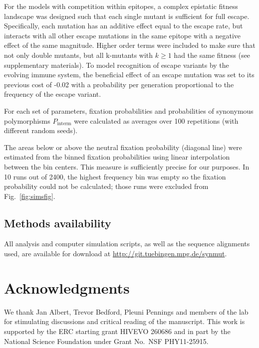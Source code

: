 \documentclass[rmp, twocolumn]{revtex4}
\newcommand{\FIG}[1]{Fig.~\ref{fig:#1}}
\begin{document}
For the models with competition within epitopes, a complex epistatic fitness
landscape was designed such that each single mutant is sufficient for full
escape. Specifically, each mutation has an additive effect equal to the
escape rate, but interacts with all other escape mutations in the same
epitope with a negative effect of the same magnitude. 
Higher order terms were included to make sure that not
only double mutants, but all k-mutants with $k \geq 1$ had the same fitness (see
supplementary materials). To model recognition of escape variants by the
evolving immune system, the beneficial effect of an escape mutation was set
to its previous cost of -0.02 with a probability per generation proportional to
the frequency of the escape variant.

For each set of parameters, fixation probabilities and probabilities of
synonymous polymorphisms $P_\text{interm}$ were calculated as averages over
100 repetitions (with different random seeds).

The areas below or above the neutral fixation probability (diagonal line) were
estimated from the binned fixation probabilities using linear interpolation
between the bin centers. This measure is sufficiently precise for our purposes.
In 10 runs out of 2400, the highest frequency bin was empty so the fixation
probability could not be calculated; those runs were excluded from
\FIG{simsfig}.

\subsection*{Methods availability}
All analysis and computer simulation scripts, as well as the sequence alignments
used, are available for download at \url{http://git.tuebingen.mpg.de/synmut}.

\section*{Acknowledgments}
We thank Jan Albert, Trevor Bedford, Pleuni Pennings and members of the lab for 
stimulating discussions and critical reading of the manuscript.
This work is supported by the ERC starting grant HIVEVO 260686 and 
in part by the National Science Foundation under Grant No.~NSF PHY11-25915.



\newpage
\appendix
\onecolumngrid
\setcounter{figure}{0}

\end{document}
